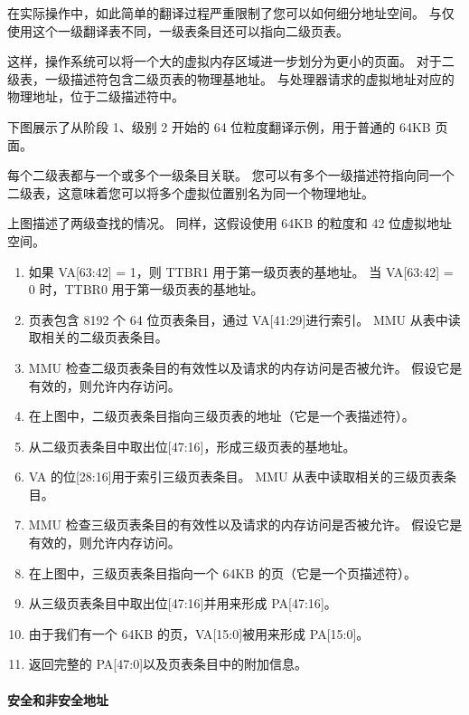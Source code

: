 在实际操作中，如此简单的翻译过程严重限制了您可以如何细分地址空间。
与仅使用这个一级翻译表不同，一级表条目还可以指向二级页表。

这样，操作系统可以将一个大的虚拟内存区域进一步划分为更小的页面。
对于二级表，一级描述符包含二级页表的物理基地址。
与处理器请求的虚拟地址对应的物理地址，位于二级描述符中。

下图展示了从阶段 1、级别 2 开始的 64 位粒度翻译示例，用于普通的 64KB 页面。


每个二级表都与一个或多个一级条目关联。
您可以有多个一级描述符指向同一个二级表，这意味着您可以将多个虚拟位置别名为同一个物理地址。

上图描述了两级查找的情况。
同样，这假设使用 64KB 的粒度和 42 位虚拟地址空间。

\begin{enumerate}
\item
  如果 VA{[}63:42{]} = 1，则 TTBR1 用于第一级页表的基地址。
  当 VA{[}63:42{]}
  = 0 时，TTBR0 用于第一级页表的基地址。
\item
  页表包含 8192 个 64 位页表条目，通过 VA{[}41:29{]}进行索引。
  MMU 从表中读取相关的二级页表条目。
\item
  MMU 检查二级页表条目的有效性以及请求的内存访问是否被允许。
  假设它是有效的，则允许内存访问。
\item
  在上图中，二级页表条目指向三级页表的地址（它是一个表描述符）。
\item
  从二级页表条目中取出位{[}47:16{]}，形成三级页表的基地址。
\item
  VA 的位{[}28:16{]}用于索引三级页表条目。
  MMU 从表中读取相关的三级页表条目。
\item
  MMU 检查三级页表条目的有效性以及请求的内存访问是否被允许。
  假设它是有效的，则允许内存访问。
\item
  在上图中，三级页表条目指向一个 64KB 的页（它是一个页描述符）。
\item
  从三级页表条目中取出位{[}47:16{]}并用来形成 PA{[}47:16{]}。
\item
  由于我们有一个 64KB 的页，VA{[}15:0{]}被用来形成 PA{[}15:0{]}。
\item
  返回完整的 PA{[}47:0{]}以及页表条目中的附加信息。
\end{enumerate}

\paragraph*{安全和非安全地址}

